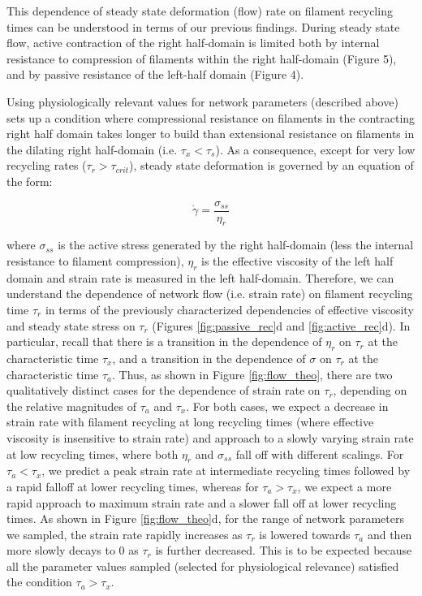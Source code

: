 \documentclass[10pt,letterpaper]{article}
\begin{document}
This dependence of steady state deformation (flow) rate on filament recycling times can be understood in terms of our previous findings.  During steady state flow, active contraction of the right half-domain is limited both by internal resistance to compression of filaments within the right half-domain (Figure 5), and by passive resistance of the left-half domain (Figure 4).  

Using physiologically relevant values for network parameters (described above) sets up a condition where compressional resistance on filaments in the contracting right half domain takes longer to build than extensional resistance on filaments in the dilating right half-domain (i.e. $\tau_x<\tau_s$). As a consequence, except for very low recycling rates ($\tau_r>\tau_{crit}$),  steady state deformation is governed by an equation of the form:

\begin{equation}
\label{eqn:everybody_knows_that}
\dot{\gamma} = \frac{\sigma_{ss}}{\eta_r}  
\end{equation}

where $\sigma_{ss}$ is the active stress generated by the right half-domain (less the internal resistance to filament compression), $\eta_r$ is the effective viscosity of the left half domain and strain rate is measured in the left half-domain.  Therefore, we can understand the dependence of network flow (i.e. strain rate) on filament recycling time $\tau_r$ in terms of the previously characterized dependencies of effective viscosity and steady state stress on $\tau_r$ (Figures \ref{fig:passive_rec}d and \ref{fig:active_rec}d). In particular, recall that there is a transition in the dependence of $\eta_r$ on $\tau_r$ at the characteristic time $\tau_x$, and a transition in the dependence of $\sigma$ on $\tau_r$ at the characteristic time $\tau_a$.  Thus, as shown in Figure \ref{fig:flow_theo},  there are two qualitatively distinct cases for the dependence of strain rate on $\tau_r$, depending on the relative magnitudes of $\tau_a$ and $\tau_x$.  For both cases, we expect a decrease in strain rate with filament recycling at long recycling times (where effective viscosity is insensitive to strain rate)  and approach to a slowly varying strain rate at low recycling times, where both $\eta_r$ and $\sigma_{ss}$ fall off with different scalings. For $\tau_a < \tau_x$, we predict a peak strain rate at intermediate recycling times followed by a rapid falloff at lower recycling times, whereas for $\tau_a > \tau_x$, we expect a more rapid approach to maximum strain rate and a slower fall off at lower recycling times.  As shown in Figure \ref{fig:flow_theo}d, for the range of network parameters we sampled, the strain rate rapidly increases as $\tau_r$ is lowered towards $\tau_a$ and then more slowly decays to 0 as $\tau_r$ is further decreased.  This is to be expected because all the parameter values sampled (selected for physiological relevance) satisfied the condition $\tau_a > \tau_x$.
\end{document}
